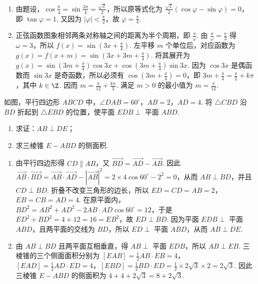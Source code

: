 \begin{solution}
\begin{enumerate}
\item 由题设，\(\cos\frac{\pi}{4}=\sin\frac{3\pi}{4}=\frac{\sqrt{2}}{2}\)，所以原等式化为 \(\frac{\sqrt{2}}{2}\left(\cos\varphi-\sin\varphi\right)=0\)，即 \(\tan\varphi=1\). 又因为 \(|\varphi|<\frac{\pi}{2}\)，故 \(\varphi=\frac{\pi}{4}\).
\item 正弦函数图象相邻两条对称轴之间的距离为半个周期，即 \(\frac{\pi}{\omega}\). 由 \(\frac{\pi}{\omega}=\frac{\pi}{3}\) 得 \(\omega=3\)，所以 \(f(x)=\sin\left(3x+\frac{\pi}{4}\right)\). 左平移 \(m\) 个单位后，对应函数为 \(g(x)=f(x+m)=\sin\left(3x+3m+\frac{\pi}{4}\right)\). 将其展开为 \(g(x)=\sin\left(3m+\frac{\pi}{4}\right)\cos 3x+\cos\left(3m+\frac{\pi}{4}\right)\sin 3x\). 因为 \(\cos 3x\) 是偶函数而 \(\sin 3x\) 是奇函数，所以必须有 \(\cos\left(3m+\frac{\pi}{4}\right)=0\)，即 \(3m+\frac{\pi}{4}=\frac{\pi}{2}+k\pi\)，其中 \(k\in\Z\). 因而 \(m=\frac{\pi}{12}+\frac{k\pi}{3}\). 满足 \(m>0\) 的最小值为 \(m=\frac{\pi}{12}\).
\end{enumerate}
\end{solution}

\begin{problem}
如图，平行四边形 \(ABCD\) 中，\(\angle DAB = 60^{\circ}\)，\(AB = 2\)，\(AD = 4\). 将 \(\triangle CBD\) 沿 \(BD\) 折起到 \(\triangle EBD\) 的位置，使平面 \(EDB \perp\) 平面 \(ABD\).

\begin{enumerate}
\item 求证：\(AB \perp DE\)；
\item 求三棱锥 \(E-ABD\) 的侧面积.
\end{enumerate}


\end{problem}

\begin{solution}
\begin{enumerate}
\item 由平行四边形得 \(CD\parallel AB\)，又 \(\overrightarrow{BD}=\overrightarrow{AD}-\overrightarrow{AB}\). 因此 \(\overrightarrow{AB}\cdot\overrightarrow{BD}=\overrightarrow{AB}\cdot\overrightarrow{AD}-|\overrightarrow{AB}|^2=2\times4\cos60^{\circ}-2^2=0\)，从而 \(AB\perp BD\)，并且 \(CD\perp BD\). 折叠不改变三角形的边长，所以 \(ED=CD=AB=2\)，\(EB=CB=AD=4\). 在原平面内，\(BD^2=AB^2+AD^2-2AB\cdot AD\cos60^{\circ}=12\)，于是 \(ED^2+BD^2=4+12=16=EB^2\)，故 \(ED\perp BD\). 因为平面 \(EDB\perp\) 平面 \(ABD\)，且两平面的交线为 \(BD\)，所以 \(ED\perp\) 平面 \(ABD\)，从而 \(AB\perp DE\).

\item 由 \(AB\perp BD\) 且两平面互相垂直，得 \(AB\perp\) 平面 \(EDB\)，所以 \(AB\perp EB\). 三棱锥的三个侧面面积分别为 \([EAB]=\frac{1}{2}AB\cdot EB=4\)，\([EAD]=\frac{1}{2}AD\cdot ED=4\)，\([EBD]=\frac{1}{2}BD\cdot ED=\frac{1}{2}\times2\sqrt{3}\times2=2\sqrt{3}\). 因此三棱锥 \(E-ABD\) 的侧面积为 \(4+4+2\sqrt{3}=8+2\sqrt{3}\).
\end{enumerate}
\end{solution}

